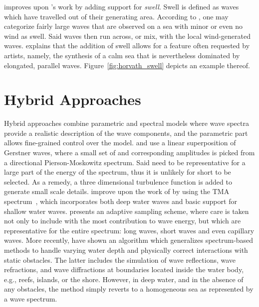 %
%
\textcolor{changed}{
\citet{Horvath:2015} improves upon \citeauthor{course:simulatingocean}'s
work by adding support for \emph{swell}. Swell is defined as waves which
have travelled out of their generating area. According to \citet{Ochi:2005},
one may categorize fairly large waves that are observed on a sea with minor
or even no wind as swell. Said waves then run across, or mix, with the
local wind-generated waves. 
\citeauthor{Horvath:2015} explains that the addition of swell allows
for a feature often requested by artists, namely, the synthesis of a
calm sea that is nevertheless dominated by elongated, parallel waves. Figure~\ref{fig:horvath_swell} depicts an example thereof.
}

\section{Hybrid Approaches}
Hybrid approaches combine parametric and spectral models where wave spectra
provide a realistic description of the wave components, and the parametric part
allows fine-grained control over the model.
\citet{Thon:2000} and \citet{Thon:2002} use a linear superposition
of Gerstner waves, where a small set of \wavevectors and corresponding
amplitudes is picked from a directional Pierson-Moskowitz spectrum. Said
\wavevectors need to be representative for a large part of the energy of the
spectrum, thus it is unlikely for short \wavelengths to be selected. As a remedy,
a three dimensional turbulence function \citep{Perlin:1985} is added to generate
small scale details. \citet{lee:2007} improve upon the work of
\citeauthor{Thon:2000} by using the TMA spectrum~\citep{Hughes:1984}, which
incorporates both deep water waves and basic support for shallow water waves.
\cite{article:frechot2007} presents an adaptive sampling scheme, where care is
taken not only to include \wavevectors with the most contribution to wave
energy, but \wavevectors which are representative for the entire spectrum:
long waves, short waves and even capillary waves.
\textcolor{changed}{
More recently, \citet{Jeschke:2015} have shown an algorithm which
generalizes spectrum-based methods to handle varying water depth
and physically correct interactions with static obstacles. The latter
includes the simulation of wave reflections, wave refractions, and wave
diffractions at boundaries located inside the water body, e.g., reefs,
islands, or the shore.
However, in deep water, and in the absence of any obstacles, the method simply reverts to a homogeneous sea as represented by a wave spectrum.
}

